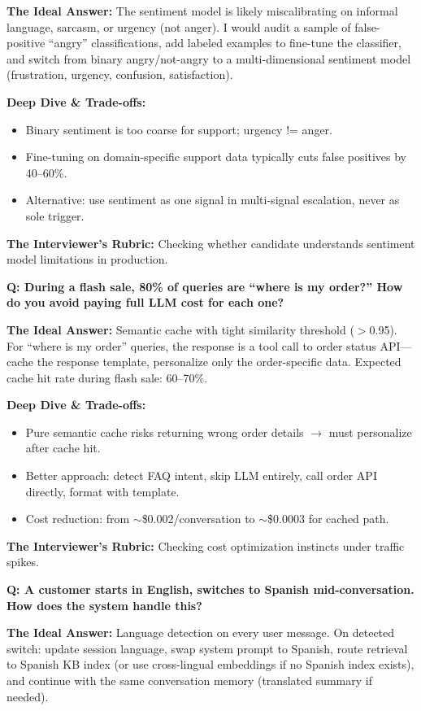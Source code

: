 \textbf{The Ideal Answer:} The sentiment model is likely miscalibrating on informal language, sarcasm, or urgency (not anger). I would audit a sample of false-positive ``angry'' classifications, add labeled examples to fine-tune the classifier, and switch from binary angry/not-angry to a multi-dimensional sentiment model (frustration, urgency, confusion, satisfaction).

\textbf{Deep Dive \& Trade-offs:}
\begin{itemize}
  \item Binary sentiment is too coarse for support; urgency != anger.
  \item Fine-tuning on domain-specific support data typically cuts false positives by 40--60\%.
  \item Alternative: use sentiment as one signal in multi-signal escalation, never as sole trigger.
\end{itemize}

\textbf{The Interviewer's Rubric:} Checking whether candidate understands sentiment model limitations in production.

\textbf{Q: During a flash sale, 80\% of queries are ``where is my order?'' How do you avoid paying full LLM cost for each one?}

\textbf{The Ideal Answer:} Semantic cache with tight similarity threshold ($>$0.95). For ``where is my order'' queries, the response is a tool call to order status API---cache the response template, personalize only the order-specific data. Expected cache hit rate during flash sale: 60--70\%.

\textbf{Deep Dive \& Trade-offs:}
\begin{itemize}
  \item Pure semantic cache risks returning wrong order details $\rightarrow$ must personalize after cache hit.
  \item Better approach: detect FAQ intent, skip LLM entirely, call order API directly, format with template.
  \item Cost reduction: from $\sim$\$0.002/conversation to $\sim$\$0.0003 for cached path.
\end{itemize}

\textbf{The Interviewer's Rubric:} Checking cost optimization instincts under traffic spikes.

\textbf{Q: A customer starts in English, switches to Spanish mid-conversation. How does the system handle this?}

\textbf{The Ideal Answer:} Language detection on every user message. On detected switch: update session language, swap system prompt to Spanish, route retrieval to Spanish KB index (or use cross-lingual embeddings if no Spanish index exists), and continue with the same conversation memory (translated summary if needed).

